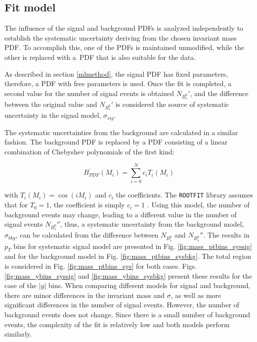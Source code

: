 \subsection{Fit model}

The influence of the signal and background PDFs is analyzed independently to establish the systematic uncertainty deriving from the chosen invariant mass PDF. To accomplish this, one of the PDFs is maintained unmodified, while the other is replaced with a PDF that is also suitable for the data.

As described in section \ref{mlmethod}, the signal PDF has fixed parameters, therefore, a PDF with free parameters is used. Once the fit is completed, a second value for the number of signal events is obtained $N_{B_s^{0}}'$, and the difference between the original value and $N_{B_s^{0}}'$ is considered the source of systematic uncertainty in the signal model, $\sigma_{sig}$.

The systematic uncertainties from the background are calculated in a similar fashion. The background PDF is replaced by a PDF consisting of a linear combination of Chebyshev polynomials of the first kind:

\begin{equation}
	B_{PDF}^{'}(M_i) = \sum_{i=0}^{N} c_i T_i(M_i) 
\end{equation}

with \cite{mason2002chebyshev} $T_i(M_i) = \cos(iM_i)$ and $c_i$ the coefficients. The \verb|ROOTFIT| library assumes that for $T_0 = 1$, the coefficient is simply $c_i = 1$ \cite{chebyshev}. Using this model, the number of background events may change, leading to a different value in the number of signal events  $N_{B_s^{0}}''$, thus, a systematic uncertainty from the background model, $\sigma_{bkg}$, can be calculated from the difference between $N_{B_s^{0}}$ and $N_{B_s^{0}}''$. The results in $p_T$ bins for systematic signal model are presented in Fig. \ref{fig:mass_ptbins_syssig} and for the background model in Fig. \ref{fig:mass_ptbins_sysbkg}. The total region is considered in Fig. \ref{fig:mass_ptbins_sys} for both cases. Figs. \ref{fig:mass_ybins_syssig} and \ref{fig:mass_ybins_sysbkg} present these results for the case of the $|y|$ bins. When comparing different models for signal and background, there are minor differences in the invariant mass and $\sigma$, as well as more significant differences in the number of signal events. However, the number of background events does not change. Since there is a small number of background events, the complexity of the fit is relatively low and both models perform similarly.

